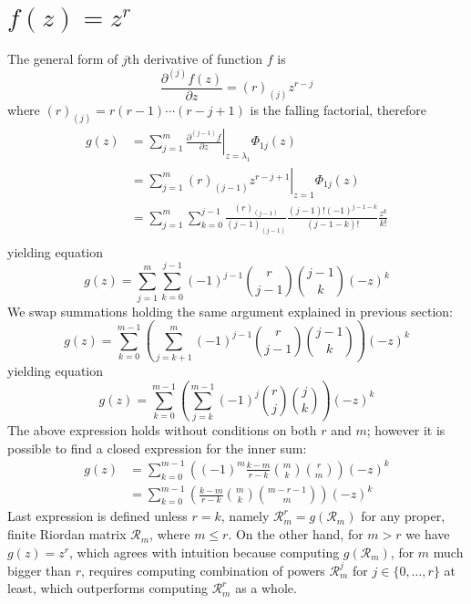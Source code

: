 \section{$f(z)=z^{r}$}

The general form of $j$th derivative of function $f$ is 
$$\frac{\partial^{(j)}{f}(z)}{\partial{z}} = (r)_{(j)} z^{r-j}$$ 
where $(r)_{(j)} = r(r-1)\cdots(r-j+1)$ is the falling factorial, therefore
\begin{displaymath}
\begin{split}
  g(z) &= \sum_{j=1}^{m}{ \left. \frac{\partial^{(j-1)}{f}}{\partial{z}} \right|_{z=\lambda_{1}}\Phi_{1j}(z)} \\
       &= \sum_{j=1}^{m}{ \left. (r)_{(j-1)} z^{r-j+1} \right|_{z=1}\Phi_{1j}(z)} \\
       &= \sum_{j=1}^{m}{\sum_{k=0}^{j-1}{\frac{(r)_{(j-1)}}{(j-1)_{(j-1)}}\frac{(j-1)!(-1)^{j-1-k}}{(j-1-k)!}\frac{z^{k}}{k!}}} \\
\end{split}
\end{displaymath}
yielding equation
\begin{equation}
  g(z) = \sum_{j=1}^{m}{\sum_{k=0}^{j-1}{(-1)^{j-1}{{r}\choose{j-1}}{{j-1}\choose{k}}(-z)^{k}}} 
\end{equation}
We swap summations holding the same argument explained in previous section:
\begin{displaymath}
  g(z) = \sum_{k=0}^{m-1}{\left(\sum_{j=k+1}^{m}{(-1)^{j-1}{{r}\choose{j-1}}{{j-1}\choose{k}}}\right)(-z)^{k}}
\end{displaymath}
yielding equation
\begin{equation}
  g(z) = \sum_{k=0}^{m-1}{\left(\sum_{j=k}^{m-1}{(-1)^{j}{{r}\choose{j}}{{j}\choose{k}}}\right)(-z)^{k}}
\end{equation}
The above expression holds without conditions on both $r$ and $m$; however it is possible 
to find a closed expression for the inner sum:
\begin{eqnarray}
  g(z) &= \sum_{k=0}^{m-1}{\left(\left(-1\right)^{m}\frac{ k - m }{r-k}{\binom{m}{k}} {\binom{r}{m}}\right)(-z)^{k}}\\
       &= \sum_{k=0}^{m-1}{\left(\frac{ k - m }{r-k}{\binom{m}{k}} {\binom{m-r-1}{m}}\right)(-z)^{k}}
\end{eqnarray}
Last expression is defined unless $r=k$, namely $\mathcal{R}_{m}^{r}=g(\mathcal{R}_{m})$ for any proper, 
finite Riordan matrix $\mathcal{R}_{m}$, where $m\leq r$. On the other hand, for $m>r$ we have 
$g(z)=z^{r}$, which agrees with intuition because computing $g(\mathcal{R}_{m})$, for $m$ much bigger than $r$, 
requires computing combination of powers $\mathcal{R}_{m}^{j}$ for $j\in \lbrace 0,\ldots,r \rbrace$ at least,
which outperforms computing $\mathcal{R}_{m}^{r}$ as a whole.

